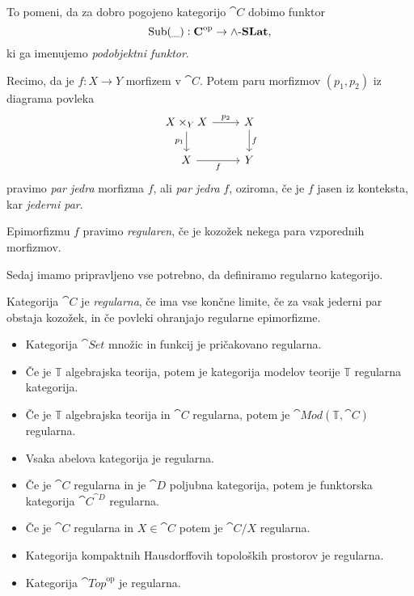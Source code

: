 \documentclass[../kategoricna_logika.tex]{subfiles}
\begin{document}
To pomeni, da za dobro pogojeno kategorijo $\cat{C}$ dobimo funktor
$$\operatorname{Sub}(\_) : {\operatorname{\mathbf{C}}}^{\mathrm{op}} \to {\operatorname{\mathbf{\wedge-\mathbf{SLat}}}},$$
ki ga imenujemo \emph{podobjektni funktor}.
\begin{definicija}
    Recimo, da je $f : X \to Y$ morfizem v $\cat{C}$. Potem paru morfizmov $(p_1, p_2)$ iz diagrama povleka
    \begin{equation*}
        \begin{tikzcd}
        X \times_Y X \ar[d, "p_1"'] \ar[r, "p_2"] & X \ar[d, "f"] \\
        X \ar[r, "f"'] & Y
        \end{tikzcd}
    \end{equation*}
    pravimo \emph{par jedra} morfizma $f$, ali \emph{par jedra} $f$, oziroma,
    če je $f$ jasen iz konteksta, kar \emph{jederni par}.
\end{definicija}
\begin{definicija}
  Epimorfizmu $f$ pravimo \emph{regularen}, če je kozožek nekega para vzporednih morfizmov.
\end{definicija}
Sedaj imamo pripravljeno vse potrebno, da definiramo regularno kategorijo.
\begin{definicija}
    Kategorija $\cat{C}$ je \emph{regularna}, če ima vse končne limite,
    če za vsak jederni par obstaja kozožek, in če povleki ohranjajo regularne epimorfizme.
\end{definicija}
\begin{primer}
\begin{itemize}
  \item Kategorija $\cat{Set}$ množic in funkcij je pričakovano regularna.
  \item Če je $\mathbb{T}$ algebrajska teorija, potem je kategorija modelov teorije $\mathbb{T}$ regularna kategorija.
  \item Če je $\mathbb{T}$ algebrajska teorija in $\cat{C}$ regularna,
    potem je $\cat{Mod}(\mathbb{T}, \cat{C})$ regularna.
  \item Vsaka abelova kategorija je regularna.
  \item Če je $\cat{C}$ regularna in je $\cat{D}$ poljubna kategorija,
    potem je funktorska kategorija $\cat{C}^{\cat{D}}$ regularna.
  \item Če je $\cat{C}$ regularna in $X \in \cat{C}$ potem je $\cat{C}/X$ regularna.
  \item Kategorija kompaktnih Hausdorffovih topoloških prostorov je regularna.
  \item Kategorija $\cat{Top}^{\mathrm{op}}$ je regularna.
\end{itemize}
\end{primer}
\end{document}
